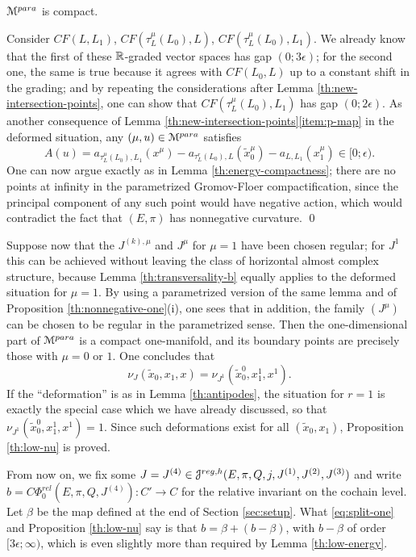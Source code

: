 \documentclass[10pt,letterpaper]{article}
\begin{document}
\begin{lemma} \label{th:no-bubbles}
$\mathcal{M}^{para}$ is compact.
\end{lemma}

\proof Consider $CF(L,L_1)$, $CF(\tau_L^\mu(L_0),L)$,
$CF(\tau_L^\mu(L_0),L_1)$. We already know that the first of these $\mathbb{R}$-graded
vector spaces has gap $(0;3\epsilon)$; for the second one, the same is true
because it agrees with $CF(L_0,L)$ up to a constant shift in the grading; and
by repeating the considerations after Lemma \ref{th:new-intersection-points},
one can show that $CF(\tau_L^\mu(L_0),L_1)$ has gap $(0;2\epsilon)$. As another
consequence of Lemma \ref{th:new-intersection-points}\ref{item:p-map} in the
deformed situation, any $(\mu,u) \in \mathcal{M}^{para}$ satisfies
\[
 A(u) = a_{\tau_L^\mu(L_0),L_1}(x^\mu) -
 a_{\tau_L^r(L_0),L}(\tilde{x}_0^\mu) - a_{L,L_1}(x_1^\mu) \in [0;\epsilon).
\]
One can now argue exactly as in Lemma \ref{th:energy-compactness}; there are no
points at infinity in the parametrized Gromov-Floer compactification, since the
principal component of any such point would have negative action, which would
contradict the fact that $(E,\pi)$ has nonnegative curvature. \qed

Suppose now that the $J^{(k),\mu}$ and $J^\mu$ for $\mu = 1$ have been chosen
regular; for $J^1$ this can be achieved without leaving the class of horizontal
almost complex structure, because Lemma \ref{th:transversality-b} equally
applies to the deformed situation for $\mu = 1$. By using a parametrized
version of the same lemma and of Proposition \ref{th:nonnegative-one}(i), one
sees that in addition, the family $(J^\mu)$ can be chosen to be regular in the
parametrized sense. Then the one-dimensional part of $\mathcal{M}^{para}$ is a compact
one-manifold, and its boundary points are precisely those with $\mu = 0$ or
$1$. One concludes that
\[
\nu_J(\tilde{x}_0,x_1,x) = \nu_{J^1}(\tilde{x}_0^0,x_1^1,x^1).
\]
If the ``deformation'' is as in Lemma \ref{th:antipodes}, the situation for $r
= 1$ is exactly the special case which we have already discussed, so that
$\nu_{J^1}(\tilde{x}_0^0,x_1^1,x^1) = 1$. Since such deformations exist for all
$(\tilde{x}_0,x_1)$, Proposition \ref{th:low-nu} is proved.

From now on, we fix some $J = J^{(4)} \in
\mathcal{J}^{reg,h}(E,\pi,Q,j,J^{(1)},J^{(2)},J^{(3)})$ and write $b =
C\Phi_0^{rel}(E,\pi,Q,J^{(4)}): C' \rightarrow C$ for the relative invariant on
the cochain level. Let $\beta$ be the map defined at the end of Section
\ref{sec:setup}. What \eqref{eq:split-one} and Proposition \ref{th:low-nu} say
is that $b = \beta + (b - \beta)$, with $b-\beta$ of order
$[3\epsilon;\infty)$, which is even slightly more than required by Lemma
\ref{th:low-energy}.
\end{document}
